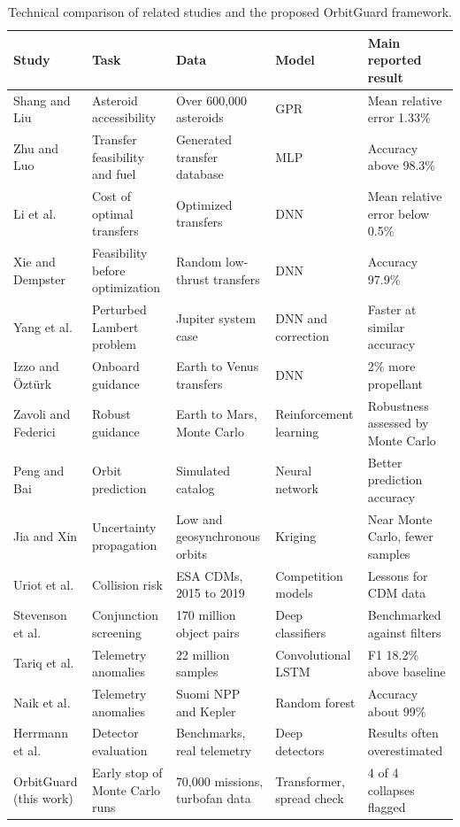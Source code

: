 \begin{table}
\caption{Technical comparison of related studies and the proposed OrbitGuard framework.}
\label{tab:related}
\begin{tabular}{lllll}
\toprule
Study & Task & Data & Model & Main reported result \\
\midrule
Shang and Liu \cite{shang2017} & Asteroid accessibility & Over 600,000 asteroids & GPR & Mean relative error 1.33\% \\
Zhu and Luo \cite{zhu2019} & Transfer feasibility and fuel & Generated transfer database & MLP & Accuracy above 98.3\% \\
Li et al. \cite{li2020deep} & Cost of optimal transfers & Optimized transfers & DNN & Mean relative error below 0.5\% \\
Xie and Dempster \cite{xie2022} & Feasibility before optimization & Random low-thrust transfers & DNN & Accuracy 97.9\% \\
Yang et al. \cite{yang2022} & Perturbed Lambert problem & Jupiter system case & DNN and correction & Faster at similar accuracy \\
Izzo and Öztürk \cite{izzo2021} & Onboard guidance & Earth to Venus transfers & DNN & 2\% more propellant \\
Zavoli and Federici \cite{zavoli2021} & Robust guidance & Earth to Mars, Monte Carlo & Reinforcement learning & Robustness assessed by Monte Carlo \\
Peng and Bai \cite{peng2018} & Orbit prediction & Simulated catalog & Neural network & Better prediction accuracy \\
Jia and Xin \cite{jia2022} & Uncertainty propagation & Low and geosynchronous orbits & Kriging & Near Monte Carlo, fewer samples \\
Uriot et al. \cite{uriot2020} & Collision risk & ESA CDMs, 2015 to 2019 & Competition models & Lessons for CDM data \\
Stevenson et al. \cite{stevenson2023} & Conjunction screening & 170 million object pairs & Deep classifiers & Benchmarked against filters \\
Tariq et al. \cite{tariq2019} & Telemetry anomalies & 22 million samples & Convolutional LSTM & F1 18.2\% above baseline \\
Naik et al. \cite{naik2020} & Telemetry anomalies & Suomi NPP and Kepler & Random forest & Accuracy about 99\% \\
Herrmann et al. \cite{herrmann2024} & Detector evaluation & Benchmarks, real telemetry & Deep detectors & Results often overestimated \\
OrbitGuard (this work) & Early stop of Monte Carlo runs & 70,000 missions, turbofan data & Transformer, spread check & 4 of 4 collapses flagged \\
\bottomrule
\end{tabular}
\end{table}

